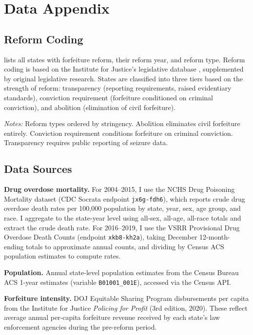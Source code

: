 \documentclass[12pt]{article}
\begin{document}
\newpage
\appendix

\section{Data Appendix}
\label{app:data}

\subsection{Reform Coding}

 lists all states with forfeiture reform, their reform year, and reform type. Reform coding is based on the Institute for Justice's legislative database \citep{carpenter2020policing}, supplemented by original legislative research. States are classified into three tiers based on the strength of reform: transparency (reporting requirements, raised evidentiary standards), conviction requirement (forfeiture conditioned on criminal conviction), and abolition (elimination of civil forfeiture).



\noindent\textit{Notes:} Reform types ordered by stringency. Abolition eliminates civil forfeiture entirely. Conviction requirement conditions forfeiture on criminal conviction. Transparency requires public reporting of seizure data. \label{tab:reforms}

\subsection{Data Sources}

\textbf{Drug overdose mortality.} For 2004--2015, I use the NCHS Drug Poisoning Mortality dataset (CDC Socrata endpoint \texttt{jx6g-fdh6}), which reports crude drug overdose death rates per 100,000 population by state, year, sex, age group, and race. I aggregate to the state-year level using all-sex, all-age, all-race totals and extract the crude death rate. For 2016--2019, I use the VSRR Provisional Drug Overdose Death Counts (endpoint \texttt{xkb8-kh2a}), taking December 12-month-ending totals to approximate annual counts, and dividing by Census ACS population estimates to compute rates.

\textbf{Population.} Annual state-level population estimates from the Census Bureau ACS 1-year estimates (variable \texttt{B01001\_001E}), accessed via the Census API.

\textbf{Forfeiture intensity.} DOJ Equitable Sharing Program disbursements per capita from the Institute for Justice \textit{Policing for Profit} (3rd edition, 2020). These reflect average annual per-capita forfeiture revenue received by each state's law enforcement agencies during the pre-reform period.
\end{document}
